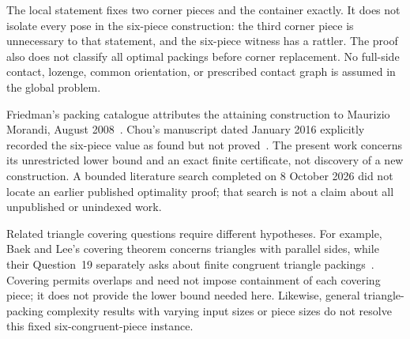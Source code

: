 \documentclass[11pt]{article}
\begin{document}
The local statement fixes two corner pieces and the container exactly. It does not isolate every pose in the six-piece construction: the third corner piece is unnecessary to that statement, and the six-piece witness has a rattler. The proof also does not classify all optimal packings before corner replacement. No full-side contact, lozenge, common orientation, or prescribed contact graph is assumed in the global problem.

Friedman's packing catalogue attributes the attaining construction to Maurizio Morandi, August 2008~\cite{FriedmanTrianglesInTriangles}. Chou's manuscript dated January 2016 explicitly recorded the six-piece value as found but not proved~\cite{Chou2016}. The present work concerns its unrestricted lower bound and an exact finite certificate, not discovery of a new construction. A bounded literature search completed on 8 October 2026 did not locate an earlier published optimality proof; that search is not a claim about all unpublished or unindexed work.

Related triangle covering questions require different hypotheses. For example, Baek and Lee's covering theorem concerns triangles with parallel sides, while their Question~19 separately asks about finite congruent triangle packings~\cite{BaekLee2025}. Covering permits overlaps and need not impose containment of each covering piece; it does not provide the lower bound needed here. Likewise, general triangle-packing complexity results with varying input sizes or piece sizes do not resolve this fixed six-congruent-piece instance.
\end{document}
